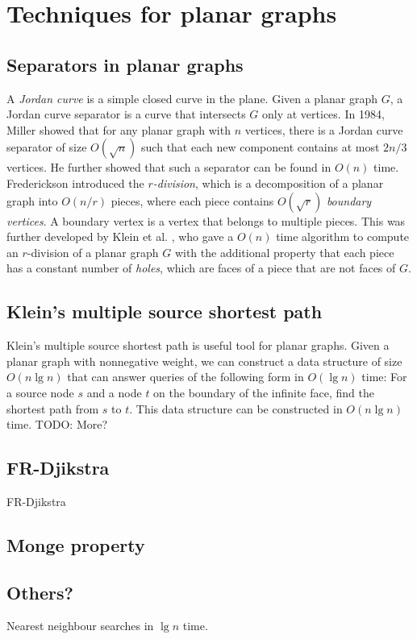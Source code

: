 \section{Techniques for planar graphs}\label{techniques}

\subsection{Separators in planar graphs}
A \textit{Jordan curve} is a simple closed curve in the plane. Given a planar graph $G$,
a Jordan curve separator is a curve that intersects $G$ only at vertices. In 1984, Miller
\cite{miller1984finding} showed that for any planar graph with $n$ vertices, there is a Jordan curve
separator of size $O(\sqrt{n})$ such that each new component contains at most $2n/3$
vertices. He further showed that such a separator can be found in $O(n)$ time. \\
Frederickson introduced the \textit{$r$-division}, which is a decomposition of a planar graph into
$O(n/r)$ pieces, where each piece contains $O(\sqrt{r})$ \textit{boundary vertices}. A
boundary vertex is a vertex that belongs to multiple pieces. This was further developed
by Klein et al. \cite{klein2013structured}, who gave a $O(n)$ time algorithm to compute
an $r$-division of a planar graph $G$ with the additional property that each piece has a constant number of \textit{holes}, which are
faces of a piece that are not faces of $G$.

\subsection{Klein's multiple source shortest path}
Klein's multiple source shortest path \cite{klein2005multiple} is useful tool for planar
graphs. Given a planar graph with nonnegative weight, we can construct a data structure
of size $O(n \lg n)$ that can answer queries of the following form in $O(\lg n)$ time:
For a source node $s$ and a node $t$ on the boundary of the infinite face, find the
shortest path from $s$ to $t$. This data structure can be constructed in $O(n \lg n)$
time. TODO: More?

\subsection{FR-Djikstra}
FR-Djikstra \cite{fakcharoenphol2006planar}\\

\subsection{Monge property}


\subsection{Others?}
Nearest neighbour searches in $\lg n$ time. \\

